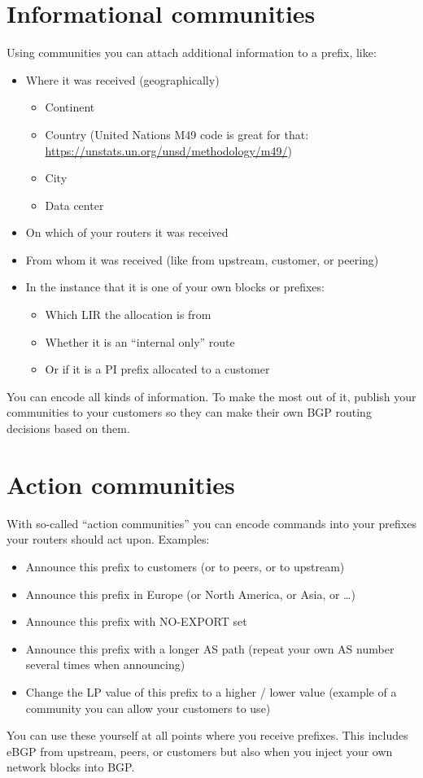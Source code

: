 \section{Informational communities}
Using communities you can attach additional information to a prefix, like:
\begin{itemize}
  \item Where it was received (geographically)
  \begin{itemize}
    \item Continent
    \item Country (United Nations M49 code is great for that: \url{https://unstats.un.org/unsd/methodology/m49/})
    \item City
    \item Data center
  \end{itemize}
  \item On which of your routers it was received
  \item From whom it was received (like from upstream, customer, or peering)
  \item In the instance that it is one of your own blocks or prefixes:
    \begin{itemize}
      \item Which LIR the allocation is from
      \item Whether it is an ``internal only'' route
      \item Or if it is a PI prefix allocated to a customer
    \end{itemize}
\end{itemize}
You can encode all kinds of information. To make the most out of it,  publish your communities to your customers so they can make their own BGP routing decisions based on them.

\section{Action communities}
With so-called ``action communities'' you can encode commands into your prefixes your routers should act upon.
Examples:
\begin{itemize}
  \item Announce this prefix to customers (or to peers, or to upstream)
  \item Announce this prefix in Europe (or North America, or Asia, or \ldots)
  \item Announce this prefix with NO-EXPORT set
  \item Announce this prefix with a longer AS path (repeat your own AS number several times when announcing)
  \item Change the \gls{LP} value of this prefix to a higher / lower value (example of a community you can allow your customers to use)
\end{itemize}
You can use these yourself at all points where you receive prefixes. This includes  eBGP from upstream, peers, or customers but also when you inject your own network blocks into BGP.

